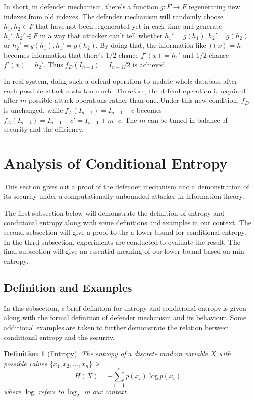 \documentclass[10pt, conference, compsocconf]{IEEEtran}
\newtheorem{mydef}{Definition}
\begin{document}
		In short, in defender mechanism,
		there's a function $g: F \rightarrow F$ regenerating 
		new indexes from old indexes. The defender mechanism
		will randomly choose $h_1, h_2 \in F$ that have
		not been regenerated yet in each time and generate
		$h_1', h_2' \in F$ in a way that attacker can't tell whether
		$h_1' = g(h_1), h_2' = g(h_2)$ or $h_2' = g(h_1), h_1' = g(h_2)$.
		By doing that, the information like $f(x) = h$ becomes
		information that there's $1/2$ chance $f'(x) = h_1'$ and $1/2$ chance $f'(x) = h_2'$.
		Thus $f_D(I_{n-1}) = I_{n-1}/2$ is achieved.
		
		In real system, doing such a defend operation to update whole
		database after each possible attack costs too much.
		Therefore, the defend operation is required after $m$
		possible attack operations rather than one. Under this
		new condition, $f_D$ is unchanged, while $f_A(I_{n-1}) = I_{n-1}+c$
		becomes $f_A(I_{n-1}) = I_{n-1}+c' = I_{n-1}+m \cdot c$.
		The $m$ can be tuned in balance of security and the
		efficiency.
		
\section{Analysis of Conditional Entropy}\label{sec_proof}
	This section gives out a proof of the defender mechanism 
	and a demonstration
	of its security under a computationally-unbounded attacker
	in information theory.
	
	The first subsection below will demonstrate the definition
	of entropy and conditional entropy along with some
	definitions and examples in our context. The second subsection
	will give a proof to the a lower bound for conditional entropy. 
	In the third subsection, experiments
	are conducted to evaluate the result. The final subsection
	will give an essential meaning of our lower bound based on min-entropy.
	
	\subsection{Definition and Examples}
		In this subsection, a brief definition for entropy and conditional
		entropy is given along with the formal definition of defender mechanism
		and its behaviour.
		Some additional examples are taken to further
		demonstrate the relation between conditional entropy and
		the security.
		
		\begin{mydef}[Entropy]\label{def_entropy}
			The entropy of a discrete random variable $X$ with
			possible values $\{x_1, x_2, \ldots, x_n\}$ is
			\begin{equation}
				H(X) = -\sum_{i=1}^n p(x_i)\log p(x_i)
			\end{equation}
			where $\log$ refers to $\log_2$ in our context.
		\end{mydef}
		
\end{document}
